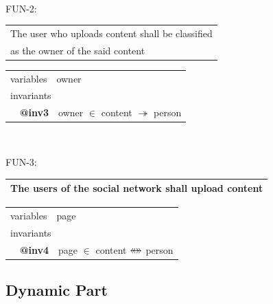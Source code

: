 \documentclass{article} %
\newcommand{\ebkeyw}[1]{\textcolor{pred}{\textsf{#1}}}
\newcommand{\ebtag}[1]{\textcolor{pgrey}{\textsf{\bf #1}}}
\begin{document}
~\\ \bigskip

\begin{center}
{\color{red!100}FUN-2}:
\begin{tabular}{|l|} \hline
The user who uploads content shall be classified \\ as the owner of
  the said content \\
\hline
\end{tabular}
\end{center}
%
\begin{center}
\begin{tabular}{l}
\ebkeyw{variables}~~owner \\
\ebkeyw{invariants}\\
~~\ebtag{@inv3}~~owner $\in$ content $\tsur$ person 
\end{tabular}
\end{center}

~\\ \bigskip

\begin{center}
{\color{red!100}FUN-3}:
\begin{tabular}{|l|} \hline
The users of the social network shall upload content \\
\hline
\end{tabular}
\end{center}
%
\begin{center}
\begin{tabular}{l}
\ebkeyw{variables}~~page \\ 
\ebkeyw{invariants}\\
~~\ebtag{@inv4}~~page $\in$ content $\mathbin{\leftrightarrow\mkern-14mu\leftrightarrow}$ person \\
\end{tabular}
\end{center}


\subsection{Dynamic Part}
\label{sec_abs_dynamic}
\end{document}

